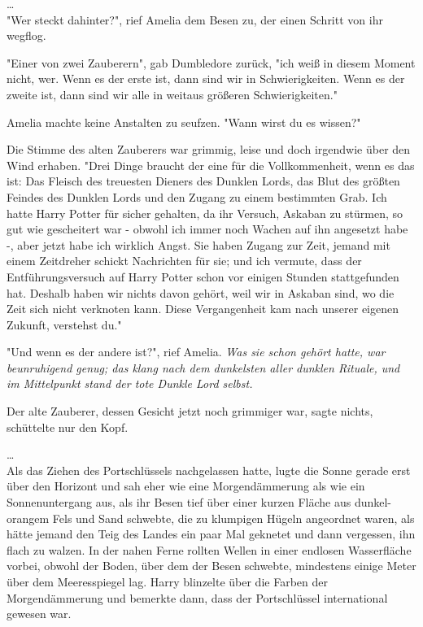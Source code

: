 {…\\ "Wer steckt dahinter?", rief Amelia dem Besen zu, der einen Schritt von ihr wegflog.

"Einer von zwei Zauberern", gab Dumbledore zurück, "ich weiß in diesem Moment nicht, wer. Wenn es der erste ist, dann sind wir in Schwierigkeiten. Wenn es der zweite ist, dann sind wir alle in weitaus größeren Schwierigkeiten."

Amelia machte keine Anstalten zu seufzen. "Wann wirst du es wissen?"

Die Stimme des alten Zauberers war grimmig, leise und doch irgendwie über den Wind erhaben. "Drei Dinge braucht der eine für die Vollkommenheit, wenn es das ist: Das Fleisch des treuesten Dieners des Dunklen Lords, das Blut des größten Feindes des Dunklen Lords und den Zugang zu einem bestimmten Grab. Ich hatte Harry Potter für sicher gehalten, da ihr Versuch, Askaban zu stürmen, so gut wie gescheitert war - obwohl ich immer noch Wachen auf ihn angesetzt habe -, aber jetzt habe ich wirklich Angst. Sie haben Zugang zur Zeit, jemand mit einem Zeitdreher schickt Nachrichten für sie; und ich vermute, dass der Entführungsversuch auf Harry Potter schon vor einigen Stunden stattgefunden hat. Deshalb haben wir nichts davon gehört, weil wir in Askaban sind, wo die Zeit sich nicht verknoten kann. Diese Vergangenheit kam nach unserer eigenen Zukunft, verstehst du."

"Und wenn es der andere ist?", rief Amelia. \emph{Was sie schon gehört hatte, war beunruhigend genug; das klang nach dem dunkelsten aller dunklen Rituale, und im Mittelpunkt stand der tote Dunkle Lord selbst.}

Der alte Zauberer, dessen Gesicht jetzt noch grimmiger war, sagte nichts, schüttelte nur den Kopf.

…\\ Als das Ziehen des Portschlüssels nachgelassen hatte, lugte die Sonne gerade erst über den Horizont und sah eher wie eine Morgendämmerung als wie ein Sonnenuntergang aus, als ihr Besen tief über einer kurzen Fläche aus dunkel-orangem Fels und Sand schwebte, die zu klumpigen Hügeln angeordnet waren, als hätte jemand den Teig des Landes ein paar Mal geknetet und dann vergessen, ihn flach zu walzen. In der nahen Ferne rollten Wellen in einer endlosen Wasserfläche vorbei, obwohl der Boden, über dem der Besen schwebte, mindestens einige Meter über dem Meeresspiegel lag. Harry blinzelte über die Farben der Morgendämmerung und bemerkte dann, dass der Portschlüssel international gewesen war.

}
